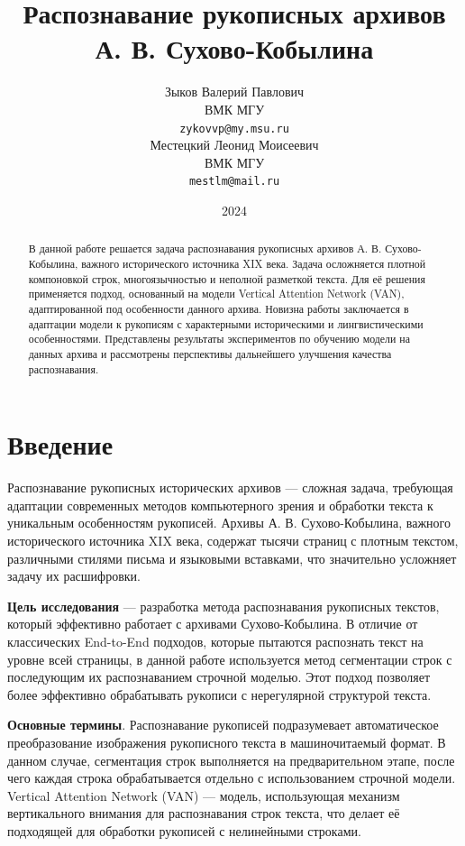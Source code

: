\documentclass{extarticle}
\title{Распознавание рукописных архивов А. В. Сухово-Кобылина}
\author{ Зыков Валерий Павлович \\
	ВМК МГУ\\
	\texttt{zykovvp@my.msu.ru} \\
	\And
	Местецкий Леонид Моисеевич \\
	ВМК МГУ \\
	\texttt{mestlm@mail.ru} \\
}
\date{2024}
\begin{document}
\maketitle
\begin{abstract}
	В данной работе решается задача распознавания рукописных архивов А. В. Сухово-Кобылина, важного исторического источника XIX века. Задача осложняется плотной компоновкой строк, многоязычностью и неполной разметкой текста. Для её решения применяется подход, основанный на модели Vertical Attention Network (VAN), адаптированной под особенности данного архива. Новизна работы заключается в адаптации модели к рукописям с характерными историческими и лингвистическими особенностями. Представлены результаты экспериментов по обучению модели на данных архива и рассмотрены перспективы дальнейшего улучшения качества распознавания.
\end{abstract}




\section{Введение}

Распознавание рукописных исторических архивов — сложная задача, требующая адаптации современных методов компьютерного зрения и обработки текста к уникальным особенностям рукописей. Архивы А. В. Сухово-Кобылина, важного исторического источника XIX века, содержат тысячи страниц с плотным текстом, различными стилями письма и языковыми вставками, что значительно усложняет задачу их расшифровки.

\textbf{Цель исследования} — разработка метода распознавания рукописных текстов, который эффективно работает с архивами Сухово-Кобылина. В отличие от классических End-to-End подходов, которые пытаются распознать текст на уровне всей страницы, в данной работе используется метод сегментации строк с последующим их распознаванием строчной моделью. Этот подход позволяет более эффективно обрабатывать рукописи с нерегулярной структурой текста.

\textbf{Основные термины}. Распознавание рукописей подразумевает автоматическое преобразование изображения рукописного текста в машиночитаемый формат. В данном случае, сегментация строк выполняется на предварительном этапе, после чего каждая строка обрабатывается отдельно с использованием строчной модели. Vertical Attention Network (VAN) — модель, использующая механизм вертикального внимания для распознавания строк текста, что делает её подходящей для обработки рукописей с нелинейными строками.
\end{document}
